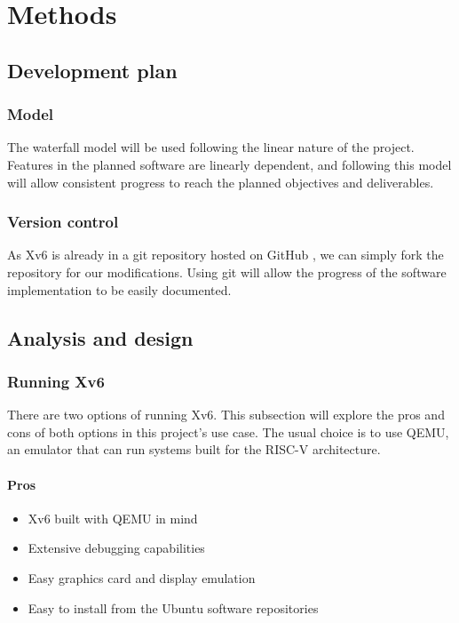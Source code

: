 \chapter{Methods}
\label{chapter2}

\section{Development plan}
\subsection{Model}
The waterfall model will be used following the linear nature of the project. 
Features in the planned software are linearly dependent, and following this model
will allow consistent progress to reach the planned objectives and deliverables.

\subsection{Version control}
As Xv6 is already in a git repository hosted on GitHub \cite{xv6:code}, 
we can simply fork the repository for our modifications. Using git will allow
the progress of the software implementation to be easily documented.

\section{Analysis and design}

\subsection{Running Xv6}
There are two options of running Xv6. This subsection will explore the pros
and cons of both options in this project's use case.
The usual choice is to use QEMU, an emulator that can run systems built for the RISC-V architecture. 

\subsubsection*{Pros}
\begin{itemize}
    \item Xv6 built with QEMU in mind
    \item Extensive debugging capabilities
    \item Easy graphics card and display emulation
    \item Easy to install from the Ubuntu software repositories
\end{itemize}
